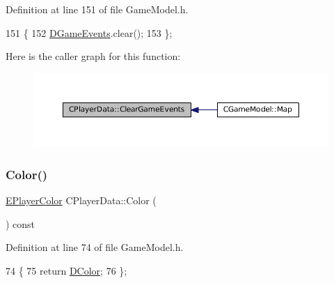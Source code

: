 Definition at line 151 of file Game\+Model.\+h.


\begin{DoxyCode}
151                               \{
152             \hyperlink{classCPlayerData_a9a7af43e88055d6d1a384a8817a655a0}{DGameEvents}.clear();  
153         \};
\end{DoxyCode}
Here is the caller graph for this function\+:
\nopagebreak
\begin{figure}[H]
\begin{center}
\leavevmode
\includegraphics[width=350pt]{classCPlayerData_a74cbe8bf72037ca113c9c40ae7bca5ec_icgraph}
\end{center}
\end{figure}
\hypertarget{classCPlayerData_a4f313db2728a8be2b24484515a2445df}{}\label{classCPlayerData_a4f313db2728a8be2b24484515a2445df} 
\subsubsection{\texorpdfstring{Color()}{Color()}}
{\footnotesize\ttfamily \hyperlink{GameDataTypes_8h_aafb0ca75933357ff28a6d7efbdd7602f}{E\+Player\+Color} C\+Player\+Data\+::\+Color (\begin{DoxyParamCaption}{ }\end{DoxyParamCaption}) const\hspace{0.3cm}{\ttfamily [inline]}}



Definition at line 74 of file Game\+Model.\+h.


\begin{DoxyCode}
74                                   \{
75             \textcolor{keywordflow}{return} \hyperlink{classCPlayerData_a65d69aaa09c8fc0f7ddfa5e858313085}{DColor};
76         \};
\end{DoxyCode}
\hypertarget{classCPlayerData_a4d203da2adbd6d00b0cd5b334bddba4f}{}\label{classCPlayerData_a4d203da2adbd6d00b0cd5b334bddba4f} 
